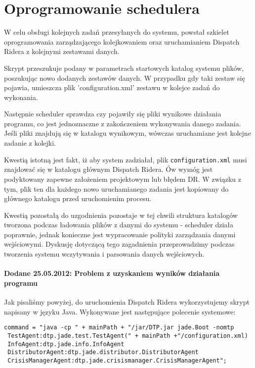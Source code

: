 \lstset{language=Java}
\chapter{Oprogramowanie schedulera}
W celu obsługi kolejnych zadań przesyłanych do systemu, powstał szkielet oprogramowania zarządzającego kolejkowaniem oraz uruchamianiem Dispatch Ridera z kolejnymi zestawami danych.


Skrypt przeszukuje podany w parametrach startowych katalog systemu plików, poszukując nowo dodanych zestawów danych. W przypadku gdy taki zestaw się pojawia, umieszcza plik 'configuration.xml' zestawu w kolejce zadań do wykonania.


Następnie scheduler sprawdza czy pojawiły się pliki wynikowe działania programu, co jest jednoznaczne z zakończeniem wykonywania danego zadania. Jeśli pliki znajdują się w katalogu wynikowym, wówczas uruchamiane jest kolejne zadanie z kolejki. 


Kwestią istotną jest fakt, iż aby system zadziałał, plik \texttt{configuration.xml} musi znajdować się w katalogu głównym Dispatch Ridera. Ów wymóg jest podyktowany zapewne założeniem projektowym lub błędem DR. W związku z tym, plik ten dla każdego nowo uruchamianego zadania jest kopiowany do głównego katalogu przed uruchomienim procesu. 


Kwestią pozostałą do uzgodnienia pozostaje w tej chwili struktura katalogów tworzona podczas ładowania plików z danymi do systemu - scheduler działa poprawnie, jednak konieczne jest wypracowanie polityki zarządzania danymi wejściowymi. Dyskusję dotyczącą tego zagadnienia przeprowadzimy podczas tworzenia systemu wczytywania i parsowania danych wejściowych.




\subsubsection{Dodane 25.05.2012: Problem z uzyskaniem wyników działania programu}

Jak pisaliśmy powyżej, do uruchomienia Dispatch Ridera wykorzystujemy skrypt napisany w języku Java. Wykonywane jest następujące polecenie systemowe:

\begin{verbatim}
command = "java -cp " + mainPath + "/jar/DTP.jar jade.Boot -nomtp
 TestAgent:dtp.jade.test.TestAgent(" + mainPath +"/configuration.xml)
 InfoAgent:dtp.jade.info.InfoAgent
 DistributorAgent:dtp.jade.distributor.DistributorAgent
 CrisisManagerAgent:dtp.jade.crisismanager.CrisisManagerAgent";
\end{verbatim}

